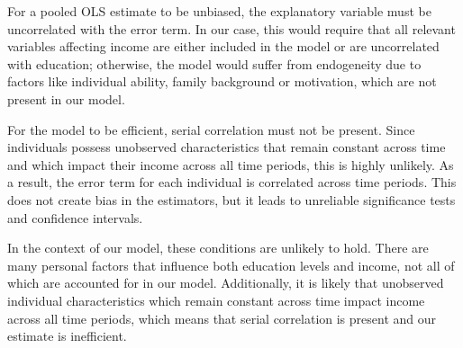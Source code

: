 For a pooled OLS estimate to be unbiased, the explanatory variable must be uncorrelated with the error term. In our case, this would require that all relevant variables affecting income are either included in the model or are uncorrelated with education; otherwise, the model would suffer from endogeneity due to factors like individual ability, family background or motivation, which are not present in our model.

For the model to be efficient, serial correlation must not be present. Since individuals possess unobserved characteristics that remain constant across time and which impact their income across all time periods, this is highly unlikely. As a result, the error term for each individual is correlated across time periods. This does not create bias in the estimators, but it leads to unreliable significance tests and confidence intervals.

In the context of our model, these conditions are unlikely to hold. There are many personal factors that influence both education levels and income, not all of which are accounted for in our model. Additionally, it is likely that unobserved individual characteristics which remain constant across time impact income across all time periods, which means that serial correlation is present and our estimate is inefficient.